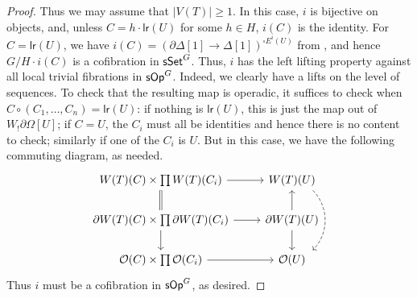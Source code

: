 \documentclass[a4paper,10pt
,draft
]{article}%
\renewcommand{\1}{\eta}%
\begin{document}
\begin{proof}
      Thus we may assume that $|V(T)| \geq 1$.
      In this case, $i$ is bijective on objects, and,
      unless $C = h \cdot \mathsf{lr} (U)$ for some $h \in H$, $i(C)$ is the identity.
      For $C = \mathsf{lr}(U)$, we have $i(C) = (\partial \Delta[1] \to \Delta[1])^{\square E^i(U)}$ from \cite[Prop. 4.5]{CM11},
      and hence $G/H \cdot i(C)$ is a cofibration in $\mathsf{sSet}^G$.
      Thus, $i$ has the left lifting property against all local trivial fibrations in $\mathsf{sOp}^G$.
      {\color{OliveGreen}
        Indeed, we clearly have a lifts on the level of sequences.
        To check that the resulting map is operadic, it suffices to check when $C \circ (C_1, \dots, C_n) = \mathsf{lr}(U)$:
        if nothing is $\mathsf{lr}(U)$, this is just the map out of $W_!\partial \Omega[U]$;
        if $C = U$, the $C_i$ must all be identities and hence there is no content to check;
        similarly if one of the $C_i$ is $U$.
        But in this case, we have the following commuting diagram, as needed.
        \begin{equation}
              \begin{tikzcd}
                    W(T)(C) \times \prod W(T)(C_i) \arrow[r] \arrow[d, equal]
                    &
                    W(T)(U) \arrow[shift left = 4, dd, bend left = 45, dashed]
                    \\
                    \partial W(T)(C) \times \prod \partial W(T)(C_i) \arrow[r] \arrow[d]
                    &
                    \partial W(T)(U) \arrow[u] \arrow[d]
                    \\
                    \O(C) \times \prod \O(C_i) \arrow[r]
                    &
                    \O(U)
              \end{tikzcd}
        \end{equation}
      } %
      Thus $i$ must be a cofibration in $\mathsf{sOp}^G$, as desired.


\end{proof}
\end{document}
